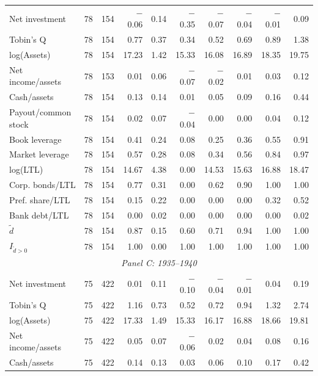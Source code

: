 \begin{table}[p]
\begin{threeparttable}
\begin{tabular}{lrrrrrrrrr}
            \midrule
            Net investment & 78 & 154 & $-$0.06 & 0.14 & $-$0.35 & $-$0.07 & $-$0.04 & $-$0.01 & 0.09 \\
            Tobin's Q & 78 & 154 & 0.77 & 0.37 & 0.34 & 0.52 & 0.69 & 0.89 & 1.38 \\
            log(Assets) & 78 & 154 & 17.23 & 1.42 & 15.33 & 16.08 & 16.89 & 18.35 & 19.75 \\
            Net income/assets & 78 & 153 & 0.01 & 0.06 & $-$0.07 & $-$0.02 & 0.01 & 0.03 & 0.12 \\
            Cash/assets & 78 & 154 & 0.13 & 0.14 & 0.01 & 0.05 & 0.09 & 0.16 & 0.44 \\
            Payout/common stock & 78 & 154 & 0.02 & 0.07 & $-$0.04 & 0.00 & 0.00 & 0.04 & 0.12 \\
            Book leverage & 78 & 154 & 0.41 & 0.24 & 0.08 & 0.25 & 0.36 & 0.55 & 0.91 \\
            Market leverage & 78 & 154 & 0.57 & 0.28 & 0.08 & 0.34 & 0.56 & 0.84 & 0.97 \\
            log(LTL) & 78 & 154 & 14.67 & 4.38 & 0.00 & 14.53 & 15.63 & 16.88 & 18.47 \\
            Corp. bonds/LTL & 78 & 154 & 0.77 & 0.31 & 0.00 & 0.62 & 0.90 & 1.00 & 1.00 \\
            Pref. share/LTL & 78 & 154 & 0.15 & 0.22 & 0.00 & 0.00 & 0.00 & 0.32 & 0.52 \\
            Bank debt/LTL & 78 & 154 & 0.00 & 0.02 & 0.00 & 0.00 & 0.00 & 0.00 & 0.02 \\
            \ensuremath{\tilde{d}} & 78 & 154 & 0.87 & 0.15 & 0.60 & 0.71 & 0.94 & 1.00 & 1.00 \\
            \ensuremath{I_{\tilde{d}>0}} & 78 & 154 & 1.00 & 0.00 & 1.00 & 1.00 & 1.00 & 1.00 & 1.00 \\
            \midrule
            \multicolumn{10}{c}{\textit{Panel C: 1935--1940}} \\
            \midrule
            Net investment & 75 & 422 & 0.01 & 0.11 & $-$0.10 & $-$0.04 & $-$0.01 & 0.04 & 0.19 \\
            Tobin's Q & 75 & 422 & 1.16 & 0.73 & 0.52 & 0.72 & 0.94 & 1.32 & 2.74 \\
            log(Assets) & 75 & 422 & 17.33 & 1.49 & 15.33 & 16.17 & 16.88 & 18.66 & 19.81 \\
            Net income/assets & 75 & 422 & 0.05 & 0.07 & $-$0.06 & 0.02 & 0.04 & 0.08 & 0.16 \\
            Cash/assets & 75 & 422 & 0.14 & 0.13 & 0.03 & 0.06 & 0.10 & 0.17 & 0.42 \\

\end{tabular}
\end{threeparttable}
\end{table}
